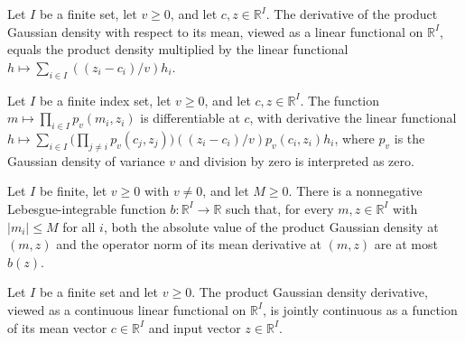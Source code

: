 \begin{lemma}
\leanok
{}
Let $I$ be a finite set, let $v\ge 0$, and let $c,z\in\mathbb R^I$. The derivative of
the product Gaussian density with respect to its mean, viewed as a linear functional on
$\mathbb R^I$, equals the product density multiplied by the linear functional
$h\mapsto\sum_{i\in I}((z_i-c_i)/v)h_i$.
\end{lemma}

\begin{lemma}
\leanok
{}
Let $I$ be a finite index set, let $v\ge0$, and let $c,z\in\mathbb R^I$. The function
$m\mapsto\prod_{i\in I}p_v(m_i,z_i)$ is differentiable at $c$, with derivative the
linear functional $h\mapsto\sum_{i\in I}\bigl(\prod_{j\ne
i}p_v(c_j,z_j)\bigr)((z_i-c_i)/v)p_v(c_i,z_i)h_i$, where $p_v$ is the Gaussian density
of variance $v$ and division by zero is interpreted as zero.
\end{lemma}

\begin{lemma}
\leanok
{}
Let $I$ be finite, let $v\ge0$ with $v\ne0$, and let $M\ge0$. There is a nonnegative
Lebesgue-integrable function $b:\mathbb R^I\to\mathbb R$ such that, for every
$m,z\in\mathbb R^I$ with $|m_i|\le M$ for all $i$, both the absolute value of the
product Gaussian density at $(m,z)$ and the operator norm of its mean derivative at
$(m,z)$ are at most $b(z)$.
\end{lemma}

\begin{lemma}
\leanok
{}
Let $I$ be a finite set and let $v\ge 0$. The product Gaussian density derivative,
viewed as a continuous linear functional on $\mathbb R^I$, is jointly continuous as a
function of its mean vector $c\in\mathbb R^I$ and input vector $z\in\mathbb R^I$.
\end{lemma}

